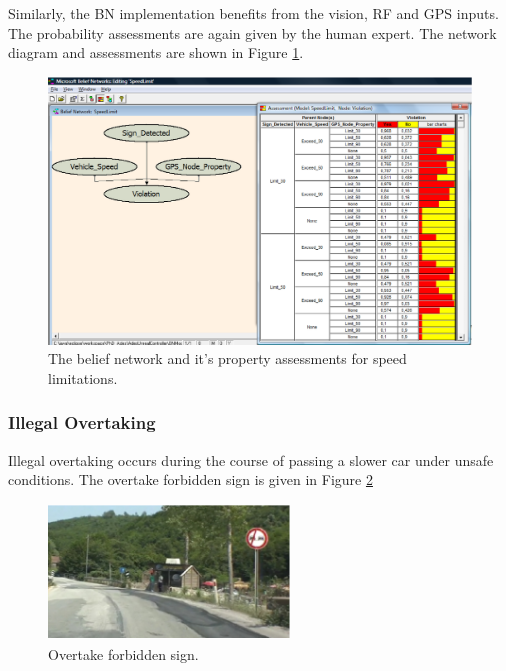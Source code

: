 \documentclass[a4paper,oneside,12pt]{report}
\begin{document}
Similarly, the BN implementation benefits from the vision, RF and GPS inputs. The probability assessments are again given by the human expert. The network diagram and assessments are shown in Figure \ref{fig:bnspeed}.

\begin{figure}[ht]
\begin{center}
\includegraphics[width=150mm]{img/speed_bn.eps}
\caption{The belief network and it's property assessments for speed limitations.}
\label{fig:bnspeed}
\end{center}
\end{figure}

\subsubsection{Illegal Overtaking}

Illegal overtaking occurs during the course of passing a slower car under unsafe conditions. The overtake forbidden sign is given in Figure \ref{fig:otfb}

\begin{figure}[ht]
\begin{center}
\includegraphics[width=64mm,height=36mm]{img/otfb.eps}
\caption{Overtake forbidden sign.}
\label{fig:otfb}
\end{center}
\end{figure}
\end{document}
